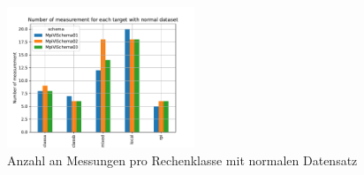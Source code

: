 \begin{figure}[h]
	\includegraphics[width=0.5\textwidth]{../gen/img/ds/normal/number_measurement_target.pdf}
	\caption{Anzahl an Messungen pro Rechenklasse mit normalen Datensatz}
	\label{fig:NumberMeasurementsNormal}
\end{figure}



